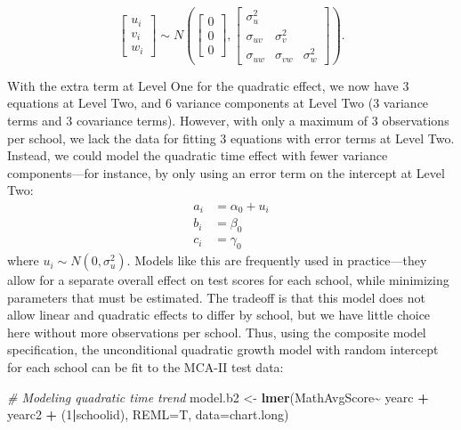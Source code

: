 \documentclass[
]{krantz}
\newenvironment{Shaded}{\begin{snugshade}}{\end{snugshade}}
\newcommand{\AttributeTok}[1]{\textcolor[rgb]{0.27,0.27,0.27}{#1}}
\newcommand{\CommentTok}[1]{\textcolor[rgb]{0.37,0.37,0.37}{\textit{#1}}}
\newcommand{\DecValTok}[1]{\textcolor[rgb]{0.06,0.06,0.06}{#1}}
\newcommand{\FunctionTok}[1]{\textcolor[rgb]{0.27,0.27,0.27}{\textbf{#1}}}
\newcommand{\NormalTok}[1]{#1}
\newcommand{\OtherTok}[1]{\textcolor[rgb]{0.37,0.37,0.37}{#1}}
\newcommand{\SpecialCharTok}[1]{\textcolor[rgb]{0.43,0.43,0.43}{\textbf{#1}}}
\begin{document}
\[ \left[ \begin{array}{c}
            u_{i} \\ v_{i} \\ w_{i}
          \end{array}  \right] \sim N \left( \left[
          \begin{array}{c}
            0 \\ 0 \\ 0
          \end{array} \right], \left[
          \begin{array}{ccc}
            \sigma_{u}^{2} & & \\
            \sigma_{uv} & \sigma_{v}^{2} & \\
            \sigma_{uw} & \sigma_{vw} & \sigma_{w}^{2}
          \end{array} \right] \right) . \]

With the extra term at Level One for the quadratic effect, we now have 3 equations at Level Two, and 6 variance components at Level Two (3 variance terms and 3 covariance terms). However, with only a maximum of 3 observations per school, we lack the data for fitting 3 equations with error terms at Level Two. Instead, we could model the quadratic time effect with fewer variance components---for instance, by only using an error term on the intercept at Level Two:\\
\begin{align*}
a_{i} & = \alpha_{0} + u_{i}\\
b_{i} & = \beta_{0}\\ 
c_{i} & = \gamma_{0}
\end{align*}
where \(u_{i}\sim N(0,\sigma^2_u)\). Models like this are frequently used in practice---they allow for a separate overall effect on test scores for each school, while minimizing parameters that must be estimated. The tradeoff is that this model does not allow linear and quadratic effects to differ by school, but we have little choice here without more observations per school. Thus, using the composite model specification, the unconditional quadratic growth model with random intercept for each school can be fit to the MCA-II test data:

\begin{Shaded}
\begin{Highlighting}[]
\CommentTok{\# Modeling quadratic time trend}
\NormalTok{model.b2 }\OtherTok{\textless{}{-}} \FunctionTok{lmer}\NormalTok{(MathAvgScore}\SpecialCharTok{\textasciitilde{}}\NormalTok{ yearc }\SpecialCharTok{+}\NormalTok{ yearc2 }\SpecialCharTok{+}\NormalTok{ (}\DecValTok{1}\SpecialCharTok{|}\NormalTok{schoolid), }
  \AttributeTok{REML=}\NormalTok{T, }\AttributeTok{data=}\NormalTok{chart.long)}
\end{Highlighting}
\end{Shaded}
\end{document}

